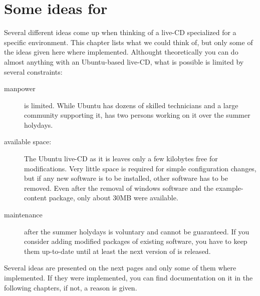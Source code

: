 
\chapter{Some ideas for \tunix}
Several different ideas come up when thinking of a live-CD specialized for a
specific environment. This chapter lists what we could think of, but only some
of the ideas given here where implemented. Althought theoretically you can do
almost anything with an Ubuntu-based live-CD, what is possible is limited by
several constraints:
\begin{description}
 \item[manpower] is limited. While Ubuntu has dozens of skilled technicians and
   a large community supporting it, \tunix has two persons working on it over
   the summer holydays.
 \item[available space:] The Ubuntu live-CD as it is leaves only a few kilobytes
   free for modifications. Very little space is required for simple
   configuration changes, but if any new software is to be installed, other
   software has to be removed. Even after the removal of windows software and the
   example-content package, only about 30MB were available.
 \item[maintenance] after the summer holydays is voluntary and cannot be
   guaranteed. If you consider adding modified packages of existing software,
   you have to keep them up-to-date until at least the next version of \tunix is
   released.
\end{description}
Several ideas are presented on the next pages and only some of them where
implemented. If they were implemented, you can find documentation on it in the
following chapters, if not, a reason is given.
